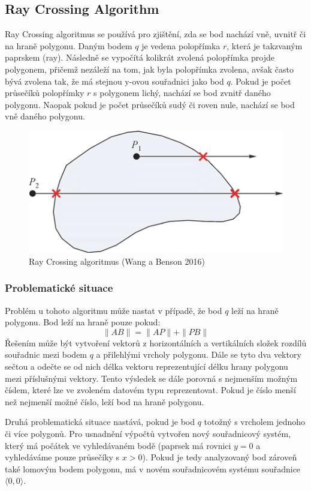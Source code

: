 \documentclass{article}
\begin{document}
\begin{spacing}{1.5}
\subsection{Ray Crossing Algorithm}
Ray Crossing algoritmus se používá pro zjištění, zda se bod nachází vně, uvnitř či na hraně polygonu. Daným bodem $q$  je vedena polopřímka $r$, která je takzvaným paprskem (ray). Následně se vypočítá kolikrát zvolená polopřímka projde polygonem, přičemž nezáleží na tom, jak byla polopřímka zvolena, avšak často bývá zvolena tak, že má stejnou y-ovou souřadnici jako bod $q$. Pokud je počet průsečíků polopřímky $r$ s polygonem lichý, nachází se bod zvnitř daného polygonu. Naopak pokud je počet průsečíků sudý či roven nule, nachází se bod vně daného polygonu.

\begin{figure}[h]
    \centering
    \includegraphics[width=0.7\linewidth]{images/ray.png}
    \caption{Ray Crossing algoritmus (Wang a Benson 2016)}
    \label{fig:enter-label}
\end{figure}

\subsubsection{Problematické situace}
Problém u tohoto algoritmu může nastat v případě, že bod $q$ leží na hraně polygonu. Bod leží na hraně pouze pokud:
$$\|AB\| = \|AP\| + \|PB\|$$
Řešením může být vytvoření vektorů z horizontálních a vertikálních složek rozdílů souřadnic mezi bodem $q$ a přilehlými vrcholy polygonu. Dále se tyto dva vektory sečtou a odečte se od nich délka vektoru reprezentující délku hrany polygonu mezi příslušnými vektory. Tento výsledek se dále porovná s nejmenším možným číslem, které lze ve zvoleném datovém typu reprezentovat. Pokud je číslo menší než nejmenší možné číslo, leží bod na hraně polygonu.

Druhá problematická situace nastává, pokud je bod $q$ totožný s vrcholem jednoho či více polygonů. Pro usnadnění výpočtů vytvořen nový souřadnicový systém, který má počátek ve vyhledávaném bodě (paprsek má rovnici $y = 0$ a vyhledáváme pouze průsečíky s $x>0$). Pokud je tedy analyzovaný bod zároveň také lomovým bodem polygonu, má v novém souřadnicovém systému souřadnice $\langle 0,0 \rangle$.


\end{spacing}
\end{document}
